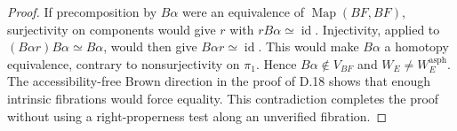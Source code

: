 \begin{proof}
If precomposition by $B\alpha$ were an equivalence of
$\operatorname{Map}(BF,BF)$, surjectivity on components would
give $r$ with $rB\alpha\simeq\operatorname{id}$. Injectivity,
applied to $(B\alpha r)B\alpha\simeq B\alpha$, would then give
$B\alpha r\simeq\operatorname{id}$. This would make $B\alpha$
a homotopy equivalence, contrary to nonsurjectivity on $\pi_1$.
Hence $B\alpha\notin V_{BF}$ and
$W_E\ne W_E^{\mathrm{asph}}$. The accessibility-free Brown
direction in the proof of D.18 shows that enough intrinsic
fibrations would force equality. This contradiction completes
the proof without using a right-properness test along an
unverified fibration.
\end{proof}
